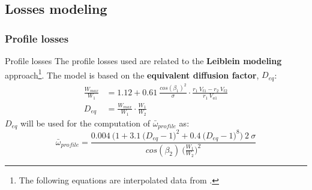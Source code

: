 \subsection{Losses modeling}
\subsubsection{Profile losses}
	\begin{frame}{Profile losses}
		The profile losses used are related to the \textbf{Leiblein modeling} approach\footnote{The following equations are interpolated data from \cite[Ch. 6]{axial2004}.}.
		\newline
		The model is based on the \textbf{equivalent diffusion factor}, $D_{eq}$:
		\begin{align}
			\frac{W_{max}}{W_1} & = 1.12 + 0.61 \ \frac{cos(\beta_1)^2}{\sigma} \cdot \frac{r_1 \ V_{t1} - r_2 \ V_{t2}}{r_1 \ V_{a1}} \nonumber \\
			D_{eq} & = \frac{W_{max}}{W_1} \cdot \frac{W_1}{W_2} \nonumber  
		\end{align}
		$D_{eq}$ will be used for the computation of $\bar{\omega}_{profile}$ as:
		\begin{equation}
			\bar{\omega}_{profile} = \frac{0.004 \ \Big( 1 + 3.1 \ \big( D_{eq} - 1 \big)^2 + 0.4 \ \big( D_{eq} - 1 \big)^8 \Big) \ 2 \ \sigma}{cos(\beta_2) \ \Big( \frac{W_1}{W_2} \Big)^2} \nonumber
		\end{equation}
	\end{frame}
